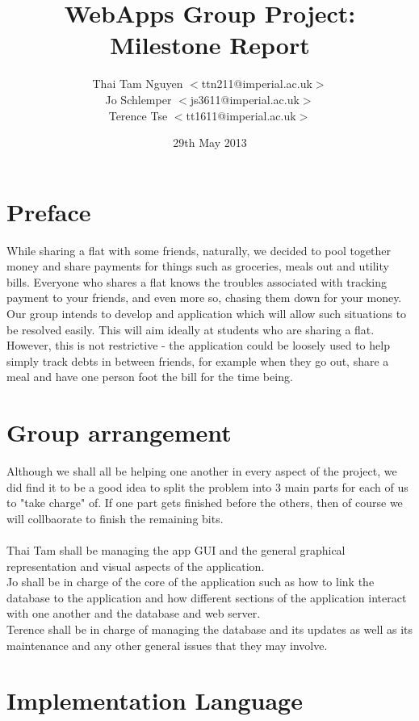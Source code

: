 \documentclass[a4paper,9t]{article}
\begin{document}
\title{WebApps Group Project: Milestone Report} \date{29th May
  2013} \author{
  Thai Tam Nguyen $<$ttn211@imperial.ac.uk$>$\\
  Jo Schlemper $<$js3611@imperial.ac.uk$>$\\
  Terence Tse  $<$tt1611@imperial.ac.uk$>$ }
\maketitle
\newpage
\section*{Preface}
While sharing a flat with some friends, naturally, we decided to pool together money and share payments for things such as groceries, meals out and utility bills. Everyone who shares a flat knows the troubles associated with tracking payment to your friends, and even more so, chasing them down for your money. Our group intends to develop and application which will allow such situations to be resolved easily. This will aim ideally at students who are sharing a flat. However, this is not restrictive - the application could be loosely used to help simply track debts in between friends, for example when they go out, share a meal and have one person foot the bill for the time being.\\

\section*{Group arrangement}
Although we shall all be helping one another in every aspect of the project, we did find it to be a good idea to split the problem into 3 main parts for each of us to "take charge" of. If one part gets finished before the others, then of course we will collbaorate to finish the remaining bits.\\ \\
Thai Tam shall be managing the app GUI and the general graphical representation and visual aspects of the application.\\
Jo shall be in charge of the core of the application such as how to link the database to the application and how different sections of the application interact with one another and the database and web server.\\
Terence shall be in charge of managing the database and its updates as well as its maintenance and any other general issues that they may involve.

\section*{Implementation Language}
\end{document}
